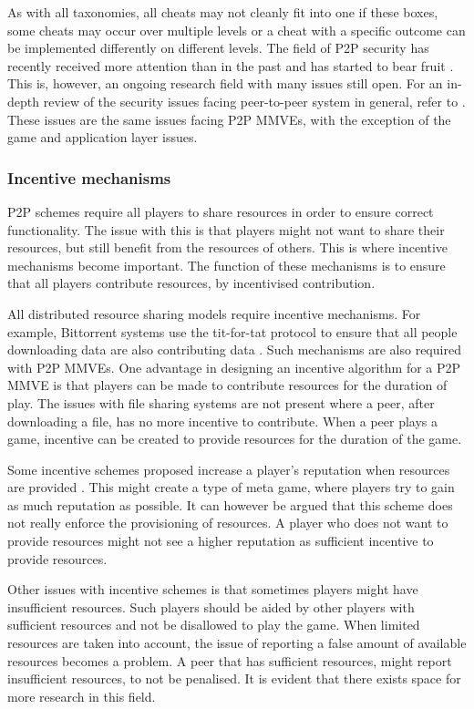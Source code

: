 As with all taxonomies, all cheats may not cleanly fit into one if these boxes, some cheats may occur over multiple levels or a cheat with a specific outcome can be implemented differently on different levels. The field of P2P security has recently received more attention than in the past and has
started to bear fruit \cite{survey_p2p_game_cheats}. This is, however, an ongoing research field with many issues still open. For an in-depth review
of the security issues facing peer-to-peer system in general, refer to \cite{p2p_security_issues}. These issues are the same issues facing P2P MMVEs, with the exception of the game and application layer issues.

\subsubsection{Incentive mechanisms}

P2P schemes require all players to share resources in order to ensure correct functionality. The issue with this is that players might not want to share their resources, but still benefit from the resources of others. This is where incentive mechanisms become important. The function of these
mechanisms is to ensure that all players contribute resources, by incentivised contribution.

All distributed resource sharing models require incentive mechanisms. For example, Bittorrent systems use the tit-for-tat protocol to ensure that all
people downloading data are also contributing data \cite{tit_for_tat}. Such mechanisms are also required with P2P MMVEs. One advantage in designing
an incentive algorithm for a P2P MMVE is that players can be made to contribute resources for the duration of play. The issues with file sharing
systems are not present where a peer, after downloading a file, has no more incentive to contribute. When a peer plays a game, incentive can be
created to provide resources for the duration of the game.

Some incentive schemes proposed increase a player's reputation when resources are provided \cite{classic_p2p_reputation} \cite{proactive_reputation}. This might create a type of meta game, where players try to gain as much reputation as possible. It can however be argued that this scheme does not really enforce the provisioning of resources. A player who does not want to provide resources might not see a higher reputation as sufficient incentive to provide resources.

Other issues with incentive schemes is that sometimes players might have insufficient resources. Such players should be aided by other players with
sufficient resources and not be disallowed to play the game. When limited resources are taken into account, the issue of reporting a false amount of
available resources becomes a problem. A peer that has sufficient resources, might report insufficient resources, to not be penalised. It is evident
that there exists space for more research in this field.



